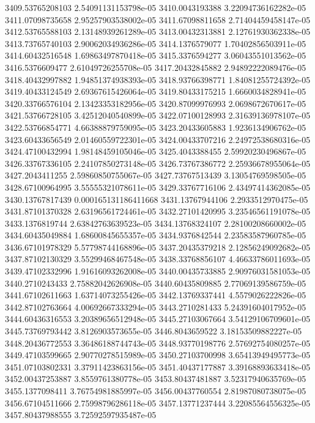 {3409.53765208103 2.54091131153798e-05
3410.0043193388 3.22094736162282e-05
3411.07098735658 2.95257903538002e-05
3411.67098811658 2.71404459458147e-05
3412.53765588103 2.13148939261289e-05
3413.00432313881 2.12761930362338e-05
3413.73765740103 2.90062034936286e-05
3414.1376579077 1.70402856503911e-05
3414.60432516548 1.69863497870418e-05
3415.3376594277 3.06043551013562e-05
3416.5376609477 2.61049726255708e-05
3417.20432845882 2.94892222089476e-05
3418.40432997882 1.94851374938393e-05
3418.93766398771 1.84081255724392e-05
3419.40433124549 2.69367615426064e-05
3419.80433175215 1.6660034828941e-05
3420.33766576104 2.13423353182956e-05
3420.87099976993 2.0698672670617e-05
3421.53766728105 3.42512040540899e-05
3422.07100128993 2.31639136978107e-05
3422.53766854771 4.66388879759095e-05
3423.20433605883 1.9236134906762e-05
3423.60433656549 2.01460559722301e-05
3424.00433707216 2.24972538680316e-05
3424.47100432994 1.98148459105046e-05
3425.4043388455 2.59920230496867e-05
3426.33767336105 2.24107850273148e-05
3426.73767386772 2.25936678955064e-05
3427.2043411255 2.59860850755067e-05
3427.73767513439 3.13054769598505e-05
3428.67100964995 3.55555321078611e-05
3429.33767716106 2.43497414362085e-05
3430.13767817439 0.000165131186411668
3431.13767944106 2.2933512970475e-05
3431.87101370328 2.63196561724461e-05
3432.27101420995 3.23546561191078e-05
3433.1376819744 2.63842763639523e-05
3434.13768324107 2.28100208660002e-05
3434.60435049884 1.68600845655357e-05
3434.9376842544 2.23583587960785e-05
3436.67101978329 5.57798744168896e-05
3437.20435379218 2.12856249092682e-05
3437.87102130329 3.55299468467548e-05
3438.33768856107 4.46633786011693e-05
3439.47102332996 1.91616093262008e-05
3440.00435733885 2.90976031581053e-05
3440.2710243433 2.75882042626908e-05
3440.60435809885 2.77069139586759e-05
3441.67102611663 1.63714073255426e-05
3442.13769337441 4.5579026222826e-05
3442.87102763664 4.00692667333294e-05
3443.2710281433 5.24391604017952e-05
3444.60436316553 3.20389656512948e-05
3445.27103067664 3.54129106709601e-05
3445.73769793442 3.8126903573655e-05
3446.8043659522 3.18153509882227e-05
3448.20436772553 3.36486188744743e-05
3448.93770198776 2.57692754080257e-05
3449.47103599665 2.90770278515989e-05
3450.27103700998 3.65413949495773e-05
3451.07103802331 3.37911423863156e-05
3451.40437177887 3.39168893633418e-05
3452.00437253887 3.8559761380778e-05
3453.80437481887 3.52317940635769e-05
3455.1377098411 3.76754981885997e-05
3456.00437760554 2.81987080738075e-05
3456.67104511666 2.75998796286118e-05
3457.13771237444 3.22085564556325e-05
3457.80437988555 3.72592597935487e-05
}
